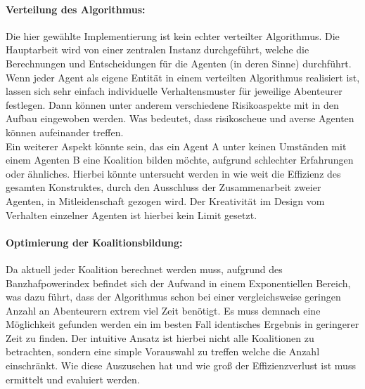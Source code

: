\documentclass[fleqn,10pt]{SelfArx} %
\begin{document}
\paragraph{Verteilung des Algorithmus:}
Die hier gewählte Implementierung ist kein echter verteilter Algorithmus. Die Hauptarbeit wird von einer zentralen Instanz durchgeführt, welche die Berechnungen und Entscheidungen für die Agenten (in deren Sinne) durchführt. Wenn jeder Agent als eigene Entität in einem verteilten Algorithmus realisiert ist, lassen sich sehr einfach individuelle Verhaltensmuster für jeweilige Abenteurer festlegen. Dann können unter anderem verschiedene Risikoaspekte mit in den Aufbau eingewoben werden. Was bedeutet, dass risikoscheue und averse Agenten können aufeinander treffen. \\
Ein weiterer Aspekt könnte sein, das ein Agent A unter keinen Umständen mit einem Agenten B	eine Koalition bilden möchte, aufgrund schlechter Erfahrungen oder ähnliches. Hierbei könnte untersucht werden in wie weit die Effizienz des gesamten Konstruktes, durch den Ausschluss der Zusammenarbeit zweier Agenten, in Mitleidenschaft gezogen wird. Der Kreativität im Design vom Verhalten einzelner Agenten ist hierbei kein Limit gesetzt.

\paragraph{Optimierung der Koalitionsbildung:}
Da aktuell jeder Koalition berechnet werden muss, aufgrund des Banzhafpowerindex befindet sich der Aufwand in einem Exponentiellen Bereich, was dazu führt, dass der Algorithmus schon bei einer vergleichsweise geringen Anzahl an Abenteurern extrem viel Zeit benötigt. Es muss demnach eine Möglichkeit gefunden werden ein im besten Fall identisches Ergebnis in geringerer Zeit zu finden. Der intuitive Ansatz ist hierbei nicht alle Koalitionen zu betrachten, sondern eine simple Vorauswahl zu treffen welche die Anzahl einschränkt. Wie diese Auszusehen hat und wie groß der Effizienzverlust ist muss ermittelt und evaluiert werden.
\end{document}

